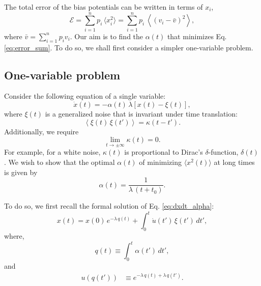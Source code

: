 \documentclass[reprint]{revtex4-1}
\begin{document}
The total error of the bias potentials can be written in
terms of $x_i$,
\begin{equation}
\mathcal E
=
\sum_{i = 1}^n p_i \, \langle x_i^2 \rangle
=
\sum_{i = 1}^n p_i \, \left\langle (v_i - \bar v)^2 \right\rangle,
\label{eq:error_sum}
\end{equation}
where
$\bar v = \sum_{i = 1}^n p_i v_i$.
%
Our aim is to find the $\alpha(t)$
that minimizes Eq. \eqref{eq:error_sum}.
%
To do so, we shall first consider
a simpler one-variable problem.



\subsection{One-variable problem}



Consider the following equation
of a single variable:
%
\begin{equation}
\dot x(t) = -\alpha(t) \, \lambda \left[ x(t) - \xi(t) \right],
\label{eq:dxdt_alpha}
\end{equation}
%
where $\xi(t)$ is a generalized noise
that is invariant under time translation:
%
\begin{equation}
\left\langle \xi(t) \, \xi(t') \right\rangle
=
\kappa(t - t').
\label{eq:noise_correlation}
\end{equation}
%
Additionally, we require
\begin{equation}
  \lim_{t \rightarrow \pm\infty} \kappa(t) = 0.
  \label{eq:kappat_limit}
\end{equation}
%
For example, for a white noise,
$\kappa(t)$ is proportional to
Dirac's $\delta$-function, $\delta(t)$.
%
We wish to show that the optimal $\alpha(t)$
of minimizing $\langle x^2(t) \rangle$ at long times
is given by
%
\begin{equation}
  \alpha(t) = \frac{1}{\lambda \, (t + t_0)}.
\label{eq:alpha_opt}
\end{equation}



To do so, we first recall
the formal solution of Eq. \eqref{eq:dxdt_alpha}:
%
\begin{equation}
x(t) = x(0) \, e^{-\lambda \, q(t)}
+ \int_0^t \dot u(t') \, \xi(t') \, dt',
\label{eq:xt_solution}
\end{equation}
%
where,
%
\begin{equation}
q(t) \equiv \int_0^t \alpha(t') \, dt',
\label{eq:qt_definition}
\end{equation}
%
and
%
\begin{align}
u(q(t'))
&\equiv
e^{-\lambda \, q(t) + \lambda \, q(t')}.
\label{eq:ut_definition}
\end{align}
\end{document}
